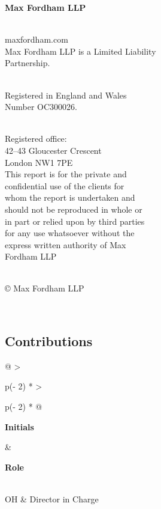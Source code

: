 \documentclass[
  letterpaper,
  DIV=11,
  numbers=noendperiod]{scrreprt}
\begin{document}
\begin{figure}[H]

\begin{minipage}{0.27\linewidth}


\justifying \noindent \scriptsize \textbf{Max Fordham LLP}~\\
\strut ~\\
maxfordham.com~\\
Max Fordham LLP is a Limited Liability~\\
Partnership.~\\
\strut ~\\
Registered in England and Wales~\\
Number OC300026.~\\
\strut ~\\
Registered office:~\\
42--43 Gloucester Crescent~\\
London NW1 7PE~\\
This report is for the private and~\\
confidential use of the clients for~\\
whom the report is undertaken and~\\
should not be reproduced in whole or\\
in part or relied upon by third parties\\
for any use whatsoever without the~\\
express written authority of Max~\\
Fordham LLP~\\
\strut ~\\
© Max Fordham LLP~\end{minipage}%
%
\begin{minipage}{0.03\linewidth}
~\end{minipage}%
%
\begin{minipage}{0.71\linewidth}

\subsection{Contributions}\label{contributions-1}

\begin{longtable}[]{@{}
  >{\raggedright\arraybackslash}p{(\columnwidth - 2\tabcolsep) * }
  >{\raggedright\arraybackslash}p{(\columnwidth - 2\tabcolsep) * }@{}}
\toprule\noalign{}
\begin{minipage}[b]{\linewidth}\raggedright
\textbf{Initials}
\end{minipage} & \begin{minipage}[b]{\linewidth}\raggedright
\textbf{Role}
\end{minipage} \\
\midrule\noalign{}
\endhead
\bottomrule\noalign{}
\endlastfoot
OH & Director in Charge \\
\end{longtable}

\end{minipage}%

\end{figure}%
\end{document}
